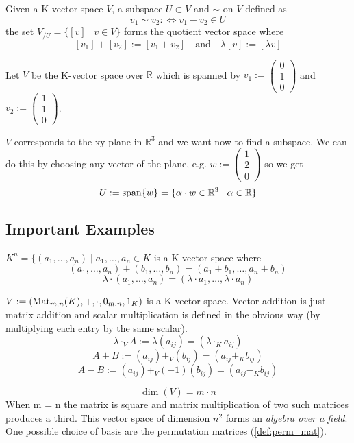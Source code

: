 \begin{definition}
   Given a K-vector space \(V\), a subspace \(U \subset V\) and \(\sim\) on \(V\) defined as
   \[v_1 \sim v_2 :\iff v_1 - v_2 \in U\]
   the set \(V_{/U} = \{[v] \mid v \in V\}\) forms the quotient vector space where
   \[[v_1] + [v_2] := [v_1 + v_2] \quad\text{and}\quad \lambda [v] := [\lambda v]\]
\end{definition}
\begin{example}
   Let \(V\) be the K-vector space over \(\mathbb{R}\) which is spanned by \(v_1 := \begin{pmatrix}0\\1\\0\end{pmatrix}\) and \(v_2 := \begin{pmatrix}1\\1\\0\end{pmatrix}\).

   \(V\) corresponds to the xy-plane in \(\mathbb{R}^3\) and we want now to find a subspace.
   We can do this by choosing any vector of the plane, e.g. \(w := \begin{pmatrix}1\\2\\0\end{pmatrix}\) so we get
   \[U := \operatorname{span}\{w\} = \{\alpha \cdot w \in \mathbb{R}^3 \mid \alpha \in \mathbb{R}\}\]
\end{example}

\subsection{Important Examples}
\begin{example}
   \(K^n = \{(a_1, \ldots, a_n) \mid a_1, \ldots, a_n \in K\) is a K-vector space where
   \[(a_1, \ldots, a_n) + (b_1, \ldots, b_n) = (a_1 + b_1, \ldots, a_n + b_n)\]
   \[\lambda \cdot (a_1, \ldots, a_n) = (\lambda \cdot a_1, \ldots, \lambda \cdot a_n)\]
\end{example}

\begin{example}
   \(V := (\operatorname{Mat}_{m,n}(K), +, \cdot, 0_{m,n}, 1_K)\) is a K-vector space.
   Vector addition is just matrix addition and scalar multiplication is defined in the obvious way (by multiplying each entry by the same scalar).
   \[\lambda \cdot_V A := \lambda (a_{ij}) = (\lambda \cdot_K a_{ij})\]
   \[A + B := (a_{ij}) +_V (b_{íj}) = (a_{ij} +_K b_{ij})\]
   \[A - B := (a_{ij}) +_V (-1)(b_{ij}) = (a_{ij} -_K b_{ij})\]

   \[\dim(V) = m \cdot n\]
   When m = n the matrix is square and matrix multiplication of two such matrices produces a third.
   This vector space of dimension \(n^2\) forms an \textit{algebra over a field}.
   One possible choice of basis are the permutation matrices (\ref{def:perm_mat}).
\end{example}

